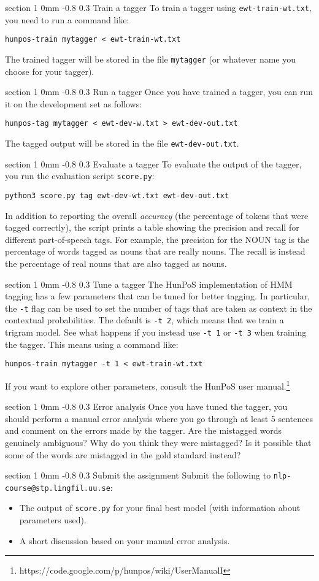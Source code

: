 \documentclass[11pt]{article}
\makeatletter
\newcommand{\newsec}[2]{\section{#1}\label{sec:#2}\noindent}
\renewcommand{\section}{\@startsection
{section}%
{1}%
{0mm}%
{-0.8\baselineskip}%
{0.3\baselineskip}%
{\bfseries\large}}%
\makeatother
\begin{document}
\newsec{Train a tagger}{train}%
To train a tagger using {\tt ewt-train-wt.txt}, you need to run a command like:
\begin{verbatim}
hunpos-train mytagger < ewt-train-wt.txt
\end{verbatim}
The trained tagger will be stored in the file {\tt mytagger} (or whatever name you choose for your tagger).

\newsec{Run a tagger}{run}%
Once you have trained a tagger, you can run it on the development set as follows:
\begin{verbatim}
hunpos-tag mytagger < ewt-dev-w.txt > ewt-dev-out.txt
\end{verbatim}
The tagged output will be stored in the file {\tt ewt-dev-out.txt}.

\newsec{Evaluate a tagger}{eval}%
To evaluate the output of the tagger, you run the evaluation script {\tt score.py}:
\begin{verbatim}
python3 score.py tag ewt-dev-wt.txt ewt-dev-out.txt
\end{verbatim}
In addition to reporting the overall \emph{accuracy} (the percentage of tokens that were tagged correctly), the script prints a table showing
the precision and recall for different part-of-speech tags. For example, the precision for the NOUN tag is the percentage of words tagged as nouns that are really nouns.
The recall is instead the percentage of real nouns that are also tagged as nouns.

\newsec{Tune a tagger}{tune}%
The HunPoS implementation of HMM tagging has a few parameters that can be tuned for better tagging. In particular, the {\tt -t} flag can be used to set the number of
tags that are taken as context in the contextual probabilities. The default is {\tt -t $\!\!$2}, which means that we train a trigram model. See what happens if you instead use {\tt -t $\!\!$1} or
{\tt -t $\!\!$3} when training the tagger. This means using a command like:
\begin{verbatim}
hunpos-train mytagger -t 1 < ewt-train-wt.txt
\end{verbatim}
If you want to explore other parameters, consult the HunPoS user manual.\footnote{https://code.google.com/p/hunpos/wiki/UserManualI}

\newsec{Error analysis}{error}%
Once you have tuned the tagger, you should perform a manual error analysis where you go through at least 5 sentences and comment on the errors made by the tagger.
Are the mistagged words genuinely ambiguous? Why do you think they were mistagged? Is it possible that some of the words are mistagged in the gold standard instead?

\newsec{Submit the assignment}{submit}%
Submit the following to {\tt nlp-course@stp.lingfil.uu.se}: 
\begin{itemize}[noitemsep,topsep=0.2cm]
\item The output of {\tt score.py} for your final best model (with information about parameters used).
\item A short discussion based on your manual error analysis.
\end{itemize}
\end{document}
